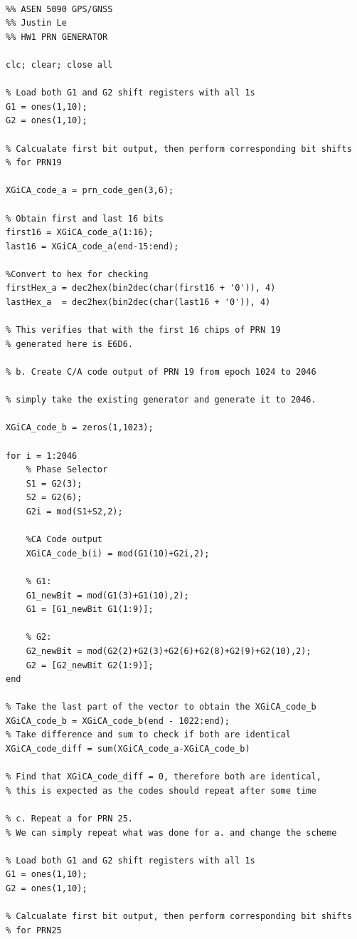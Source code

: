 \documentclass[11pt]{article}
\begin{document}
\begin{verbatim}

%% ASEN 5090 GPS/GNSS
%% Justin Le
%% HW1 PRN GENERATOR

clc; clear; close all

% Load both G1 and G2 shift registers with all 1s
G1 = ones(1,10);
G2 = ones(1,10);

% Calcualate first bit output, then perform corresponding bit shifts
% for PRN19

XGiCA_code_a = prn_code_gen(3,6);

% Obtain first and last 16 bits
first16 = XGiCA_code_a(1:16);
last16 = XGiCA_code_a(end-15:end);

%Convert to hex for checking
firstHex_a = dec2hex(bin2dec(char(first16 + '0')), 4)
lastHex_a  = dec2hex(bin2dec(char(last16 + '0')), 4)

% This verifies that with the first 16 chips of PRN 19
% generated here is E6D6.

% b. Create C/A code output of PRN 19 from epoch 1024 to 2046

% simply take the existing generator and generate it to 2046.

XGiCA_code_b = zeros(1,1023);

for i = 1:2046
    % Phase Selector
    S1 = G2(3);
    S2 = G2(6);
    G2i = mod(S1+S2,2);
    
    %CA Code output
    XGiCA_code_b(i) = mod(G1(10)+G2i,2);

    % G1:
    G1_newBit = mod(G1(3)+G1(10),2);
    G1 = [G1_newBit G1(1:9)];
    
    % G2:
    G2_newBit = mod(G2(2)+G2(3)+G2(6)+G2(8)+G2(9)+G2(10),2);
    G2 = [G2_newBit G2(1:9)];
end

% Take the last part of the vector to obtain the XGiCA_code_b
XGiCA_code_b = XGiCA_code_b(end - 1022:end);
% Take difference and sum to check if both are identical
XGiCA_code_diff = sum(XGiCA_code_a-XGiCA_code_b)

% Find that XGiCA_code_diff = 0, therefore both are identical,
% this is expected as the codes should repeat after some time

% c. Repeat a for PRN 25.
% We can simply repeat what was done for a. and change the scheme

% Load both G1 and G2 shift registers with all 1s
G1 = ones(1,10);
G2 = ones(1,10);

% Calcualate first bit output, then perform corresponding bit shifts
% for PRN25


\end{verbatim}
\end{document}
